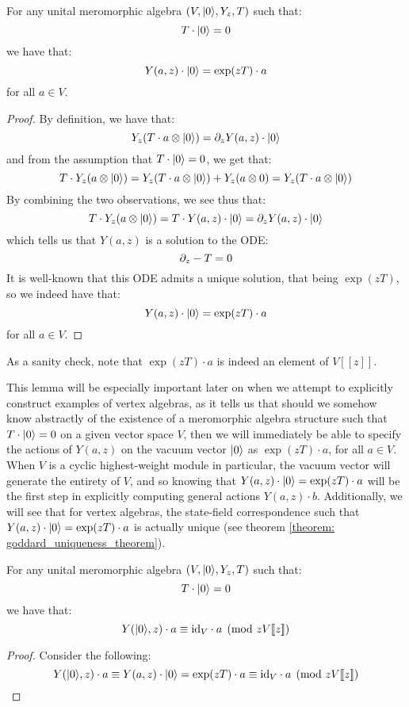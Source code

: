         \begin{lemma}
            For any unital meromorphic algebra $(V, \lvert {0} \rangle, Y_z, T)$ such that:
                $$T \cdot \lvert {0} \rangle = 0$$
            we have that:
                $$Y(a, z) \cdot \lvert {0} \rangle = \exp(zT) \cdot a$$
            for all $a \in V$.
        \end{lemma}
            \begin{proof}
                By definition, we have that:
                    $$Y_z( T \cdot a \tensor \ket{0} ) = \del_z Y(a, z) \cdot \ket{0}$$
                and from the assumption that $T \cdot \lvert {0} \rangle = 0$, we get that:
                    $$T \cdot Y_z(a \tensor \ket{0}) = Y_z(T \cdot a \tensor \ket{0}) + Y_z(a \tensor 0) = Y_z(T \cdot a \tensor \ket{0})$$
                By combining the two observations, we see thus that:
                    $$T \cdot Y_z(a \tensor \ket{0}) = T \cdot Y(a, z) \cdot \ket{0} = \del_z Y(a, z) \cdot \ket{0}$$
                which tells us that $Y(a, z)$ is a solution to the ODE:
                    $$\partial_z - T = 0$$
                It is well-known that this ODE admits a unique solution, that being $\exp(zT)$, so we indeed have that:
                    $$Y(a, z) \cdot \lvert {0} \rangle = \exp(zT) \cdot a$$
                for all $a \in V$.
            \end{proof}
        As a sanity check, note that $\exp(zT) \cdot a$ is indeed an element of $V[\![z]\!]$.

        This lemma will be especially important later on when we attempt to explicitly construct examples of vertex algebras, as it tells us that should we somehow know abstractly of the existence of a meromorphic algebra structure such that $T \cdot \lvert {0} \rangle = 0$ on a given vector space $V$, then we will immediately be able to specify the actions of $Y(a, z)$ on the vacuum vector $\lvert {0} \rangle$ as $\exp(zT) \cdot a$, for all $a \in V$. When $V$ is a cyclic highest-weight module in particular, the vacuum vector will generate the entirety of $V$, and so knowing that $Y(a, z) \cdot \lvert {0} \rangle = \exp(zT) \cdot a$ will be the first step in explicitly computing general actions $Y(a, z) \cdot b$. Additionally, we will see that for vertex algebras, the state-field correspondence such that $Y(a, z) \cdot \lvert {0} \rangle = \exp(zT) \cdot a$ is actually unique (see theorem \ref{theorem: goddard_uniqueness_theorem}).

        \begin{corollary} \label{coro: vacuum_fields}
            For any unital meromorphic algebra $(V, \lvert {0} \rangle, Y_z, T)$ such that:
                $$T \cdot \lvert {0} \rangle = 0$$
            we have that:
                $$Y(\lvert {0} \rangle, z) \cdot a \equiv \mathrm{id}_V \cdot a \pmod{zV[\![z]\!]}$$
        \end{corollary}
            \begin{proof}
                Consider the following:
                    $$Y(\lvert {0} \rangle, z) \cdot a \equiv Y(a, z) \cdot \lvert {0} \rangle = \exp(zT) \cdot a \equiv \mathrm{id}_V \cdot a \pmod{zV[\![z]\!]}$$
            \end{proof}

